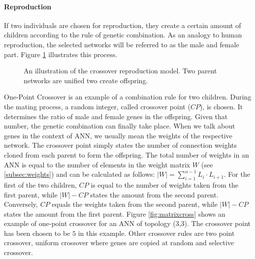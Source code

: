 \documentclass[10pt,a4paper,DIV=11]{scrreprt}
\begin{document}
\paragraph{Reproduction}
If two individuals are chosen for reproduction, they create a certain amount of children according to the rule of genetic combination. 
As an analogy to human reproduction, the selected networks will be referred to as the male and female part. Figure \ref{fig:repro} illustrates 
this process. 

\begin{figure}[H]
	\centering
	\caption{An illustration of the crossover reproduction model. Two parent networks are unified two create offspring.}
	\label{fig:repro}
\end{figure}

One-Point Crossover is an example of a combination rule for two children.
During the mating process, a random integer, called crossover point ($CP$), is chosen. It determines the ratio of male and female genes in the offspring. 
Given that number, the genetic combination can finally take place. When we talk about genes in the context of ANN, we usually mean the weights 
of the respective network. The crossover point simply states the number of connection weights cloned from each parent to form the offspring.
The total number of weights in an ANN is equal to the number of elements in the weight matrix $W$ (see \ref{subsec:weights}) and can be calculated 
as follows: $|W| = \sum^{n-1}_{i=1} L_i \cdot L_{i+1}$. For the first of the two children, $CP$ is equal to the number of weights taken from the first parent, 
while $|W|-CP$ states the amount from the second parent. Conversely, $CP$ equals the weights taken from the second parent, while $|W|-CP$ states the amount from the first parent.
Figure \ref{fig:matrixcross} shows an example of one-point crossover for an ANN of topology (3,3). The crossover point has been chosen to be $5$ in this example.
Other crossover rules are two point crossover, uniform crossover where genes are copied at random \cite{UNIFORMCROSSOVER} and selective crossover\cite{SELECTCROSSOVER}.
\end{document}
